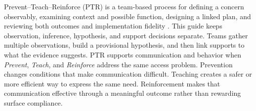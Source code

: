 
\vspace{-0.5cm}

Prevent--Teach--Reinforce (PTR) is a team-based process for defining a concern observably, examining context and possible function, designing a linked plan, and reviewing both outcomes and implementation fidelity \citep{dunlap2019ptr}. This guide keeps observation, inference, hypothesis, and support decisions separate. Teams gather multiple observations, build a provisional hypothesis, and then link supports to what the evidence suggests. PTR supports communication and behavior when \textit{Prevent}, \textit{Teach}, and \textit{Reinforce} address the same access problem. Prevention changes conditions that make communication difficult. Teaching creates a safer or more efficient way to express the same need. Reinforcement makes that communication effective through a meaningful outcome rather than rewarding surface compliance.

\renewcommand{\arraystretch}{1.0}
\setlength{\tabcolsep}{2.5pt}


